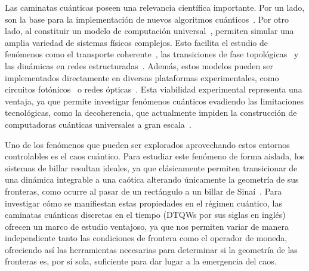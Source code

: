 \documentclass[11pt,a4paper]{article}  %
\begin{document}
Las caminatas cuánticas poseen una relevancia científica importante. Por un lado, son la base para la implementación de nuevos algoritmos cuánticos~\cite{shenvi2003quantum}. Por otro lado, al constituir un modelo de computación universal~\cite{childs2009universal,lovett2010universal}, permiten simular una amplia variedad de sistemas físicos complejos.
Esto facilita el estudio de fenómenos como el transporte coherente~\cite{mulken2011continuous,Xu_2008}, las transiciones de fase topológicas~\cite{kitagawa2010exploring} y las dinámicas en redes estructuradas~\cite{Dhamapurkar_2026,portugal2018quantum}.
Además, estos modelos pueden ser implementados directamente en diversas plataformas experimentales, como circuitos fotónicos~\cite{peruzzo2010quantum,lorz2019photonic} o redes ópticas~\cite{karski2009quantum,Schreiber_2010}. 
Esta viabilidad experimental representa una ventaja, ya que permite investigar fenómenos cuánticos evadiendo las limitaciones tecnológicas, como la decoherencia, que actualmente impiden la construcción de computadoras cuánticas universales a gran escala~\cite{portugal2018quantum}. 

Uno de los fenómenos que pueden ser explorados aprovechando estos entornos controlables es el caos cuántico. 
Para estudiar este fenómeno de forma aislada, los sistemas de billar resultan ideales, ya que clásicamente permiten transicionar de una dinámica integrable a una caótica alterando únicamente la geometría de sus fronteras, como ocurre al pasar de un rectángulo a un billar de Sinaí~\cite{sinai1970dynamical}.
Para investigar cómo se manifiestan estas propiedades en el régimen cuántico, 
las caminatas cuánticas discretas en el tiempo (DTQWs por sus siglas en inglés) 
ofrecen un marco de estudio ventajoso, ya que nos permiten variar de manera 
independiente tanto las condiciones de frontera como el operador de moneda, 
ofreciendo así las herramientas necesarias para determinar si la geometría de las fronteras es, por sí sola, suficiente para dar lugar a la emergencia del caos.
\end{document}
